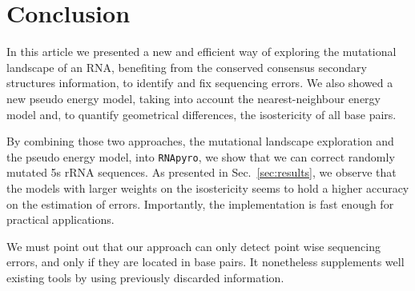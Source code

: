 \section{Conclusion}
\label{sec:conclusion}

In this article we presented a new and efficient way of
exploring the mutational landscape of an RNA, benefiting from the
 conserved consensus secondary structures  information,
to identify and fix sequencing errors. We also showed a new
 pseudo energy model, taking into account the nearest-neighbour energy model 
and, to quantify geometrical differences,  the isostericity of all base pairs. 

By combining those two approaches,  the 
mutational landscape exploration and the pseudo energy model,
 into \texttt{RNApyro}, we show that we can
correct randomly mutated 5s rRNA sequences. 
As presented in Sec.~\ref{sec:results},
we observe that the models
with larger weights on the
isostericity seems to hold a higher accuracy on the estimation of errors.
Importantly, the implementation is fast enough for practical applications.

We must point out that our approach can only detect point wise 
sequencing errors, and only if they are located in base pairs. It 
nonetheless supplements well existing tools by using previously discarded
information.

